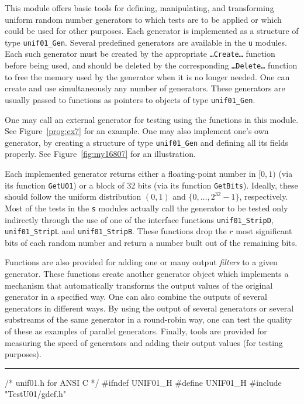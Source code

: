 
This module offers basic tools for defining, manipulating, and
transforming uniform random number generators to which tests are 
to be applied or which could be used for other purposes.
Each generator is implemented as a
structure of type {\tt unif01\_Gen}. 
Several predefined generators are available in the {\tt u} modules.
Each such generator must be created by the appropriate 
{\tt \ldots Create\ldots} function before being used, and should
be deleted by the corresponding {\tt \ldots Delete\ldots} function
to free the memory used by the generator when it is no longer needed.
One can create and use simultaneously any number of generators. 
These generators are usually passed to functions as pointers to
objects of type {\tt unif01\_Gen}.

One may call an external generator for testing using the functions in
this module. See Figure~\ref{prog:ex7} for an example.
One may also implement one's own generator, by creating a structure of 
type {\tt unif01\_Gen} and defining all its fields properly.
See Figure~\ref{fig:my16807} for an illustration.

Each implemented generator returns either a floating-point 
number in $[0, 1)$ (via its function {\tt GetU01}) 
or a block of 32 bits (via its function {\tt GetBits}).
Ideally, these should follow the uniform distribution $(0,1)$
and $\{0,\dots,2^{32}-1\}$, respectively.
Most of the tests in the {\tt s} modules actually call the generator
to be tested only indirectly through the use of one of the interface 
functions {\tt unif01\_StripD},
 {\tt unif01\_StripL} and  {\tt unif01\_StripB}.
These functions drop the $r$ most significant bits of each random number 
and return a number built out of the remaining bits.

Functions are also provided for adding one or many output {\em filters\/} 
to a given generator. These functions create another generator
object which implements a mechanism that automatically
transforms the output values of the original generator in a specified way.
One can also combine the outputs of several generators in different ways.
By using the output of several generators or several substreams of the
same generator in a round-robin way, one can test the quality of these as 
examples of parallel generators.
Finally, tools are provided for measuring the speed of generators
and adding their output values (for testing purposes).



\bigskip\hrule
\code\hide
/*  unif01.h  for ANSI C  */
#ifndef UNIF01_H
#define UNIF01_H
\endhide
#include "TestU01/gdef.h"
\endcode


